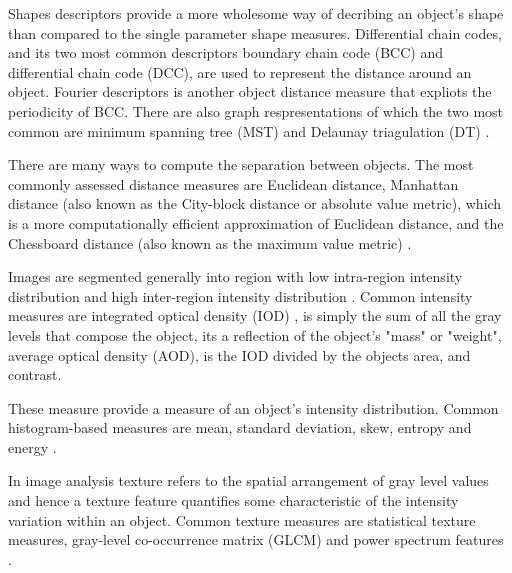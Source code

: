\begin{definition}
	Shapes descriptors provide a more wholesome way of decribing an object's shape than compared to the single parameter shape measures.
	Differential chain codes, and its two most common descriptors boundary chain code (BCC) and differential chain code (DCC), are used to represent the distance around an object.
	Fourier descriptors is another object distance measure that expliots the periodicity of BCC.
	There are also graph respresentations of which the two most common are minimum spanning tree (MST) \citep{Giesen2014,Yuan2009} and Delaunay triagulation (DT) \citep{Kozubek2000,Attali1997}.
\end{definition}

\begin{definition}
	There are many ways to compute the separation between objects.
	The most commonly assessed distance measures are Euclidean distance, Manhattan distance (also known as the City-block distance or absolute value metric), which is a more computationally efficient approximation of Euclidean distance, and the Chessboard distance (also known as the maximum value metric) \citep{French2008,Zinchuk2007}.
\end{definition}

\begin{definition}
	Images are segmented generally into region with low intra-region intensity distribution and high inter-region intensity distribution \citep{Pinkel1986,Meijering2004}.
	Common intensity measures are integrated optical density (IOD) \citep{Loferer1998,Watanabe1991}, is simply the sum of all the gray levels that compose the object, its a reflection of  the object's "mass" or "weight", average optical density (AOD), is the IOD divided by the objects area, and contrast.
\end{definition}

\begin{definition}
	These measure provide a measure of an object's intensity distribution.
	Common histogram-based measures are mean, standard deviation, skew, entropy and energy \citep{Rust2006,Boland2001}.
\end{definition}

\begin{definition}
	In image analysis texture refers to the spatial arrangement of gray level values \citep{Duda2001} and hence a texture feature quantifies some characteristic of the intensity variation within an object.
	Common texture measures are statistical texture measures, gray-level co-occurrence matrix (GLCM) \citep{Atlamazoglou2001,Cicchi2010} and power spectrum features \citep{Erik1999,Xu1996}.
\end{definition}

